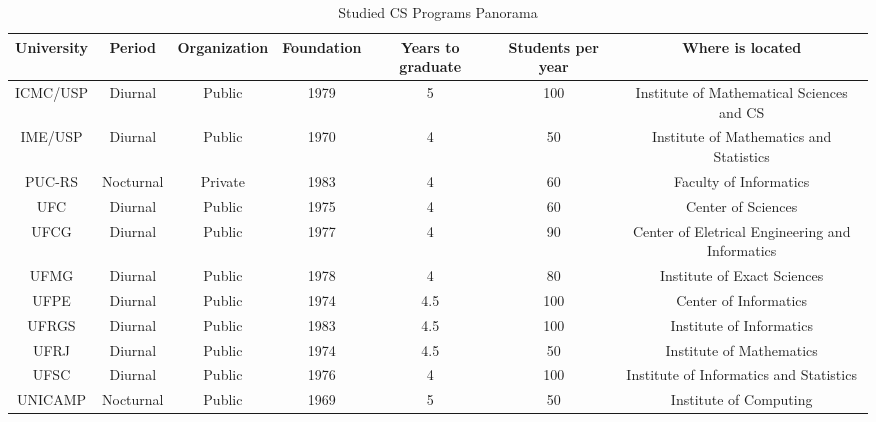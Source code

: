 \documentclass[conference]{IEEEtran}
\begin{document}
\begin{table*}
	\centering
	\caption{Studied CS Programs Panorama}
    \begin{tabular}{|c|c|c|c|c|c|c|}
        \hline
        University              & Period    & Organization & Foundation & Years to graduate & Students per year & Where is located                                   \\ \hline
        ICMC/USP \cite{fuvest}  & Diurnal   & Public       & 1979       & 5                 & 100               & Institute of Mathematical Sciences and CS        \\ 
        IME/USP \cite{fuvest}   & Diurnal   & Public       & 1970       & 4                 & 50                & Institute of Mathematics and Statistics          \\ 
        PUC-RS\cite{vest_pucrs} & Nocturnal & Private      & 1983       & 4                 & 60                & Faculty of Informatics                           \\ 
        UFC \cite{vest_ufc}     & Diurnal   & Public       & 1975       & 4                 & 60                & Center of Sciences                               \\ 
        UFCG \cite{vest_ufcg}   & Diurnal   & Public       & 1977       & 4                 & 90                & Center of Eletrical Engineering and Informatics  \\ 
        UFMG \cite{vest_ufmg}   & Diurnal   & Public       & 1978       & 4                 & 80                & Institute of Exact Sciences                      \\ 
        UFPE \cite{vest_ufpe}   & Diurnal   & Public       & 1974       & 4.5               & 100               & Center of Informatics                            \\ 
        UFRGS \cite{vest_ufrgs} & Diurnal   & Public       & 1983       & 4.5               & 100               & Institute of Informatics                         \\ 
        UFRJ \cite{vest_ufrj}   & Diurnal   & Public       & 1974       & 4.5               & 50                & Institute of Mathematics                         \\ 
        UFSC \cite{vest_ufsc}   & Diurnal   & Public       & 1976       & 4                 & 100               & Institute of Informatics and Statistics          \\ 
        UNICAMP\cite{vest_ucp}  & Nocturnal & Public       & 1969       & 5                 & 50                & Institute of Computing                           \\
        \hline
    \end{tabular}
\end{table*}
\end{document}

